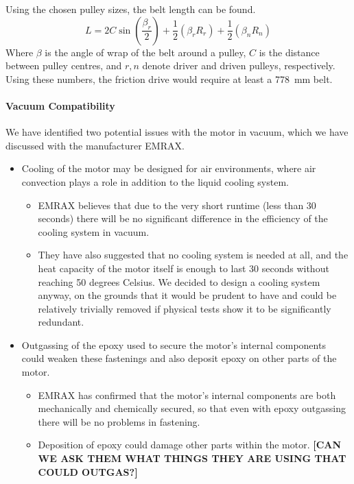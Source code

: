 \documentclass[main.tex]{subfiles}
\begin{document}
Using the chosen pulley sizes, the belt length can be found.
\begin{equation}
L = 2C\sin{(\frac{\beta_r}{2})}+{\frac{1}{2}}(\beta_rR_r)+{\frac{1}{2}}(\beta_nR_n)
\end{equation}
Where $\beta$ is the angle of wrap of the belt around a pulley, $C$ is the distance between pulley centres, and $r,n$ denote driver and driven pulleys, respectively.
Using these numbers, the friction drive would require at least a \SI{778}{mm} belt.

    \paragraph{Vacuum Compatibility}
    We have identified two potential issues with the motor in vacuum, which we have discussed with the manufacturer EMRAX.
    \begin{itemize}
        \item Cooling of the motor may be designed for air environments, where air convection plays a role in addition to the liquid cooling system.
        \begin{itemize}
            \item EMRAX believes that due to the very short runtime (less than 30 seconds) there will be no significant difference in the efficiency of the cooling system in vacuum.
            \item They have also suggested that no cooling system is needed at all, and the heat capacity of the motor itself is enough to last 30 seconds without reaching 50 degrees Celsius. We decided to design a cooling system anyway, on the grounds that it would be prudent to have and could be relatively trivially removed if physical tests show it to be significantly redundant.
        \end{itemize}
        \item Outgassing of the epoxy used to secure the motor’s internal components could weaken these fastenings and also deposit epoxy on other parts of the motor.
        \begin{itemize}
            \item EMRAX has confirmed that the motor’s internal components are both mechanically and chemically secured, so that even with epoxy outgassing there will be no problems in fastening.
            \item Deposition of epoxy could damage other parts within the motor. \textbf{[CAN WE ASK THEM WHAT THINGS THEY ARE USING THAT COULD OUTGAS?]}
        \end{itemize}
    \end{itemize}
\end{document}

